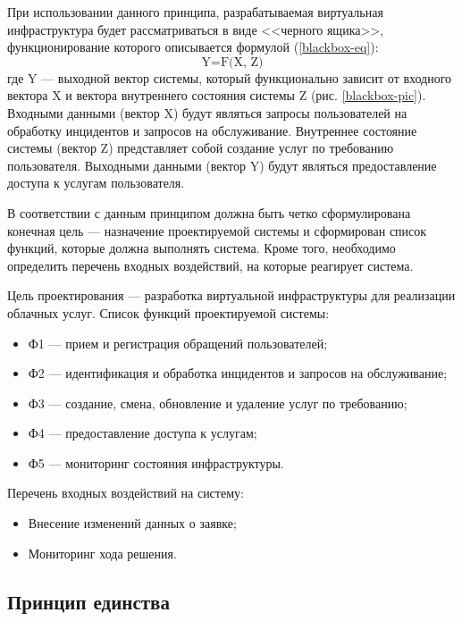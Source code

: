 При использовании данного принципа, разрабатываемая виртуальная инфраструктура будет рассматриваться в виде <<черного ящика>>, функционирование которого описывается формулой (\ref{blackbox-eq}):
\begin{equation} \label{blackbox-eq}
\text{Y=F(X, Z)}
\end{equation}
где Y --- выходной вектор системы, который функционально зависит от входного вектора X и вектора внутреннего состояния системы Z (рис. \ref{blackbox-pic}).
Входными данными (вектор X) будут являться запросы пользователей на обработку инцидентов и запросов на обслуживание.
Внутреннее состояние системы (вектор Z) представляет собой создание услуг по требованию пользователя.
Выходными данными (вектор Y) будут являться предоставление доступа к услугам пользователя.

В соответствии с данным принципом должна быть четко сформулирована конечная цель --- назначение проектируемой системы и сформирован список функций, которые должна выполнять система.
Кроме того, необходимо определить перечень входных воздействий, на которые реагирует система.

Цель проектирования --- разработка виртуальной инфраструктуры для реализации облачных услуг.
Список функций проектируемой системы:
\begin{itemize}
  \item Ф1 --- прием и регистрация обращений пользователей;
  \item Ф2 --- идентификация и обработка инцидентов и запросов на обслуживание;
  \item Ф3 --- создание, смена, обновление и удаление услуг по требованию;
  \item Ф4 --- предоставление доступа к услугам;
  \item Ф5 --- мониторинг состояния инфраструктуры.
\end{itemize}

Перечень входных воздействий на систему:
\begin{itemize}
  \item Внесение изменений данных о заявке;
  \item Мониторинг хода решения.
\end{itemize}

\subsection{Принцип единства}

